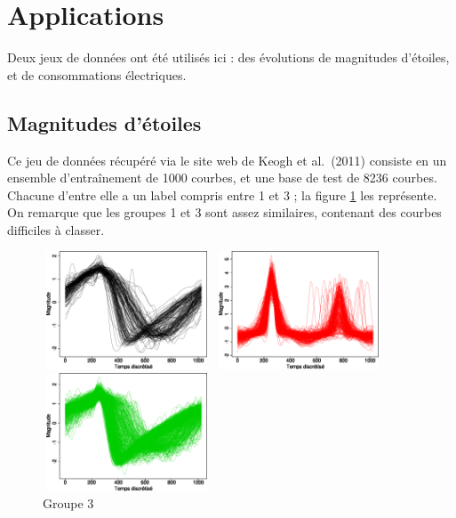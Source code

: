 \documentclass[12pt]{article}
\begin{document}
\section{Applications}

Deux jeux de données ont été utilisés ici : des évolutions de magnitudes d'étoiles, et de consommations électriques.

\subsection{Magnitudes d'étoiles}

Ce jeu de données récupéré via le site web de Keogh et al.~(2011) consiste en un ensemble d'entraînement de 1000 courbes, 
et une base de test de 8236 courbes. Chacune d'entre elle a un label compris entre 1 et 3 ; la figure \ref{figsltr3clusts} les représente. 
On remarque que les groupes 1 et 3 sont assez similaires, contenant des courbes difficiles à classer.

\begin{figure}[H]
\begin{minipage}[c]{.32\linewidth}
	\includegraphics[width=5cm,height=3.5cm]{img/slgr1.png}
	\vspace*{-0.3cm}
	\caption{Groupe 1}
\end{minipage}
\begin{minipage}[c]{.32\linewidth}
	\includegraphics[width=5cm,height=3.5cm]{img/slgr2.png}
	\vspace*{-0.3cm}
	\caption{Groupe 2}
\end{minipage}
\begin{minipage}[c]{.32\linewidth}
	\includegraphics[width=5cm,height=3.5cm]{img/slgr3.png}
	\vspace*{-0.3cm}
	\caption{Groupe 3}
\end{minipage}
\label{figsltr3clusts}
\end{figure}
\end{document}
